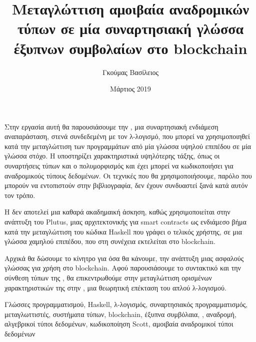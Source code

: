 \documentclass[diploma]{softlab-thesis}
\begin{document}

\frontmatter

\title{Μεταγλώττιση αμοιβαία αναδρομικών τύπων σε μία συναρτησιακή γλώσσα έξυπνων συμβολαίων στο blockchain}
\author{Γκούμας Βασίλειος}
\date{Μάρτιος 2019}




\maketitle



\begin{abstractgr}%
Στην εργασία αυτή θα παρουσιάσουμε την \FIR{}, μια συναρτησιακή ενδιάμεση αναπαράσταση, στενά
συνδεδεμένη με τον λ-λογισμό, που μπορεί να χρησιμοποιηθεί  κατά
την μεταγλώττιση των προγραμμάτων από μία γλώσσα υψηλού επιπέδου σε μία γλώσσα στόχο. Η \FIR{}
υποστηρίζει χαρακτηριστικά υψηλότερης τάξης, όπως οι συναρτήσεις τύπων
και ο πολυμορφισμός και έχει μπορεί να κωδικοποιήσει για αναδρομικούς τύπους δεδομένων. Οι τεχνικές
που θα χρησιμοποιήσουμε, παρόλο που μπορούν να εντοπιστούν στην βιβλιογραφία, δεν έχουν συνδυαστεί
ξανά κατά αυτόν τον τρόπο.

Η \FIR{} δεν αποτελεί μια καθαρά ακαδημαική άσκηση, καθώς χρησιμοποιείται στην ανάπτυξη του Plutus,
μιας αρχιτεκτονικής για smart contracts ως ενδιάμεσο βήμα κατά την μεταγλώττιση του
κώδικα Haskell που γράφει ο τελικός χρήστης, σε μια γλώσσα χαμηλού επιπέδου, που στη συνέχεια
εκτελείται στο blockchain.

Αρχικά θα δώσουμε το κίνητρο για όσα θα κάνουμε, την ανάπτυξη μιας ασφαλούς γλώσσας για
χρήση στο blockchain.  Αφού παρουσιάσουμε το συντακτικό και την σύνθεση τύπων της \FIR{}, θα επικεντρωθούμε  στην
μεταγλώττιση ορισμένων χαρακτηριστικών της στην \FOMF, μια θεωρητική επέκταση του απλού λ-λογισμού.

\begin{keywordsgr}
Γλώσσες προγραμματισμού, Haskell, λ-λογισμός, συναρτησιακός προγραμματισμός, μεταγλωττιστές, συστήματα τύπων, blockchain, έξυπνα 
συμβόλαια, \FOM{}, αναδρομή, αλγεβρικοί τύποι δεδομένων, κωδικοποίηση Scott, αμοιβαία αναδρομικοί τύποι δεδομένων
\end{keywordsgr}
\end{abstractgr}
\end{document}
